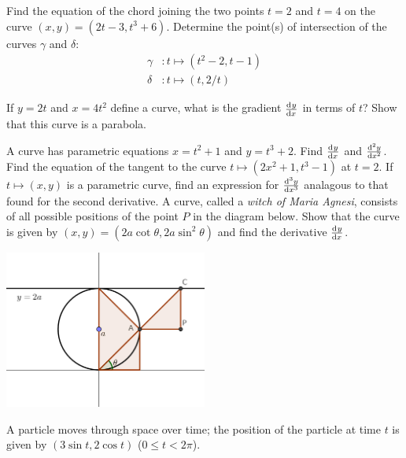 \begin{questions}
  \questioA Find the equation of the chord joining the two points $ t = 2 $ and $ t = 4 $ on the
            curve $ (x,y) = (2t - 3, t^3 + 6) $.
  \questioM Determine the point(s) of intersection of the curves $ \gamma $ and $ \delta $:
            \begin{align*}
              \gamma &: t \mapsto (t^2 - 2, t - 1)\\
              \delta &: t \mapsto (t, 2/t)
            \end{align*}
  \question
    \begin{parts}
      \parM If $ y = 2t $ and $ x = 4t^2 $ define a curve, what is the gradient $ \od{y}{x} $ in terms of $ t $?
      \parE Show that this curve is a parabola.
    \end{parts}
  \questioM A curve has parametric equations $ x = t^2 + 1 $ and $ y = t^3 + 2 $. Find $ \od{y}{x} $ and $ \od[2]{y}{x} $.
  \questioM Find the equation of the tangent to the curve $ t \mapsto (2x^2 + 1, t^3 - 1) $ at $ t = 2 $.
  \questioE If $ t \mapsto (x, y) $ is a parametric curve, find an expression for $ \od[3]{y}{x} $ analagous to that found for
            the second derivative.
  \questioS A curve, called a \textit{witch of Maria Agnesi}, consists of all possible positions of the point $ P $ in
            the diagram below. Show that the curve is given by $ (x, y) = (2a \cot \theta, 2a \sin^2 \theta) $ and
            find the derivative $ \od{y}{x} $.
            \begin{center}
              \includegraphics[width=0.5\textwidth]{agnesi-geom}
            \end{center}
  \question A particle moves through space over time; the position of the particle at time $ t $ is
            given by $ (3\sin t, 2\cos t) $ ($ 0 \leq t < 2\pi $).

\end{questions}
